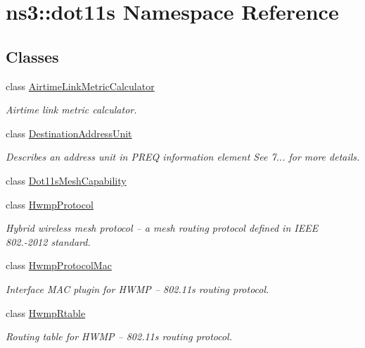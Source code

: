 \hypertarget{namespacens3_1_1dot11s}{}\section{ns3\+:\+:dot11s Namespace Reference}
\label{namespacens3_1_1dot11s}
\subsection*{Classes}
\begin{DoxyCompactItemize}
\item 
class \hyperlink{classns3_1_1dot11s_1_1AirtimeLinkMetricCalculator}{Airtime\+Link\+Metric\+Calculator}
\begin{DoxyCompactList}\small\item\em Airtime link metric calculator. \end{DoxyCompactList}\item 
class \hyperlink{classns3_1_1dot11s_1_1DestinationAddressUnit}{Destination\+Address\+Unit}
\begin{DoxyCompactList}\small\item\em Describes an address unit in P\+R\+EQ information element See 7... for more details. \end{DoxyCompactList}\item 
class \hyperlink{classns3_1_1dot11s_1_1Dot11sMeshCapability}{Dot11s\+Mesh\+Capability}
\item 
class \hyperlink{classns3_1_1dot11s_1_1HwmpProtocol}{Hwmp\+Protocol}
\begin{DoxyCompactList}\small\item\em Hybrid wireless mesh protocol -- a mesh routing protocol defined in I\+E\+EE 802.-\/2012 standard. \end{DoxyCompactList}\item 
class \hyperlink{classns3_1_1dot11s_1_1HwmpProtocolMac}{Hwmp\+Protocol\+Mac}
\begin{DoxyCompactList}\small\item\em Interface M\+AC plugin for H\+W\+MP -- 802.\+11s routing protocol. \end{DoxyCompactList}\item 
class \hyperlink{classns3_1_1dot11s_1_1HwmpRtable}{Hwmp\+Rtable}
\begin{DoxyCompactList}\small\item\em Routing table for H\+W\+MP -- 802.\+11s routing protocol. \end{DoxyCompactList}\item 

\end{DoxyCompactItemize}
